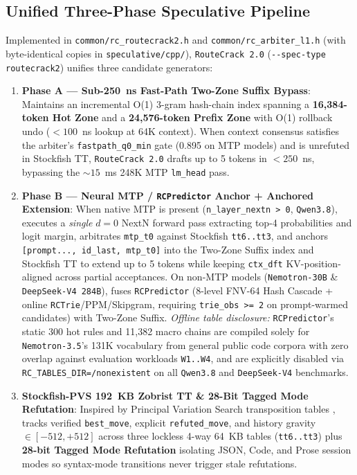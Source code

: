 \documentclass[10pt,twocolumn]{article}
\begin{document}
\subsection{Unified Three-Phase Speculative Pipeline}
Implemented in \texttt{common/rc\_routecrack2.h} and \texttt{common/rc\_arbiter\_l1.h} (with byte-identical copies in \texttt{speculative/cpp/}), \texttt{RouteCrack 2.0} (\texttt{{-}{-}spec-type routecrack2}) unifies three candidate generators:
\begin{enumerate}
    \item \textbf{Phase A --- Sub-250~ns Fast-Path Two-Zone Suffix Bypass}: Maintains an incremental O(1) 3-gram hash-chain index spanning a \textbf{16,384-token Hot Zone} and a \textbf{24,576-token Prefix Zone} with O(1) rollback undo ($<100$~ns lookup at 64K context). When context consensus satisfies the arbiter's \texttt{fastpath\_q0\_min} gate (0.895 on MTP models) and is unrefuted in Stockfish TT, \texttt{RouteCrack 2.0} drafts up to 5 tokens in $<250$~ns, bypassing the ${\sim}15$~ms 248K MTP \texttt{lm\_head} pass.
    \item \textbf{Phase B --- Neural MTP / \texttt{RCPredictor} Anchor + Anchored Extension}: When native MTP is present (\texttt{n\_layer\_nextn > 0}, \texttt{Qwen3.8}), executes a \emph{single} $d=0$ NextN forward pass extracting top-4 probabilities and logit margin, arbitrates \texttt{mtp\_t0} against Stockfish \texttt{tt6..tt3}, and anchors \texttt{[prompt..., id\_last, mtp\_t0]} into the Two-Zone Suffix index and Stockfish TT to extend up to 5 tokens while keeping \texttt{ctx\_dft} KV-position-aligned across partial acceptances. On non-MTP models (\texttt{Nemotron-30B} \& \texttt{DeepSeek-V4 284B}), fuses \texttt{RCPredictor} (8-level FNV-64 Hash Cascade + online \texttt{RCTrie}/PPM/Skipgram, requiring \texttt{trie\_obs >= 2} on prompt-warmed candidates) with Two-Zone Suffix. \emph{Offline table disclosure:} \texttt{RCPredictor}'s static 300 hot rules and 11,382 macro chains are compiled solely for \texttt{Nemotron-3.5}'s 131K vocabulary from general public code corpora with zero overlap against evaluation workloads \texttt{W1..W4}, and are explicitly disabled via \texttt{RC\_TABLES\_DIR=/nonexistent} on all \texttt{Qwen3.8} and \texttt{DeepSeek-V4} benchmarks.
    \item \textbf{Stockfish-PVS 192~KB Zobrist TT \& 28-Bit Tagged Mode Refutation}: Inspired by Principal Variation Search transposition tables \cite{stockfish}, tracks verified \texttt{best\_move}, explicit \texttt{refuted\_move}, and history gravity $\in [-512,+512]$ across three lockless 4-way 64~KB tables (\texttt{tt6..tt3}) plus \textbf{28-bit Tagged Mode Refutation} isolating JSON, Code, and Prose session modes so syntax-mode transitions never trigger stale refutations.

\end{enumerate}
\end{document}
